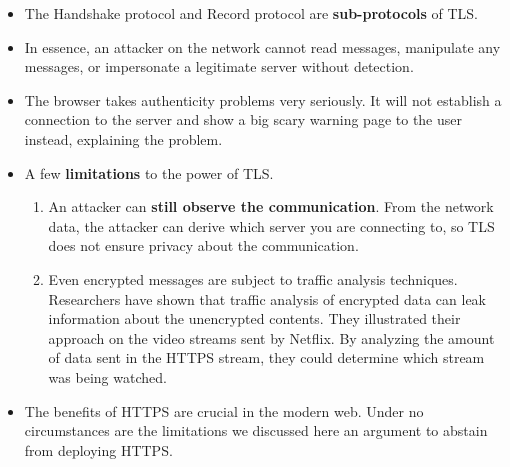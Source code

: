 \documentclass[../main.tex]{subfiles}
\begin{document}
\begin{itemize}
\begin{enumerate}
\begin{itemize}
\end{itemize}
\end{enumerate}
\item The Handshake protocol and Record protocol are \textbf{sub-protocols} of TLS.
\item In essence, an attacker on the network cannot read messages, manipulate any messages, or impersonate a legitimate server without detection.
\item The browser takes authenticity problems very seriously. It will not establish a connection to the server and show a big scary warning page to the user instead, explaining the problem.
\item A few \textbf{limitations} to the power of TLS.
\begin{enumerate}
\item An attacker can \textbf{still observe the communication}. From the network data, the attacker can derive which server you are connecting to, so TLS does not ensure privacy about the communication.
\item Even encrypted messages are subject to traffic analysis techniques. Researchers have shown that traffic analysis of encrypted data can leak information about the unencrypted contents. They illustrated their approach on the video streams sent by Netflix. By analyzing the amount of data sent in the HTTPS stream, they could determine which stream
was being watched.
\end{enumerate}
\item The benefits of HTTPS are crucial in the modern web. Under no circumstances are the limitations we discussed here an argument to abstain from deploying HTTPS.
\end{itemize}
\end{document}
